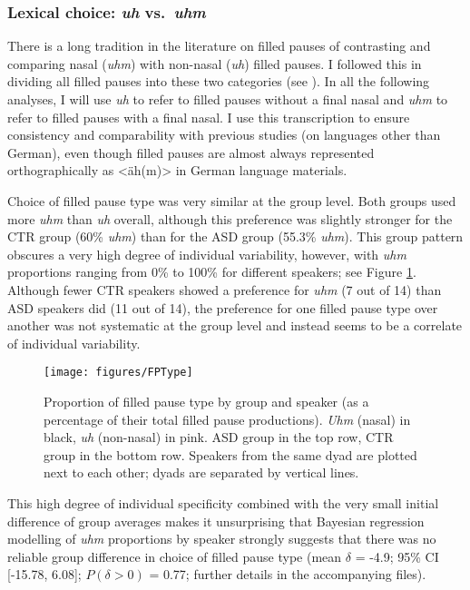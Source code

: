 \subsubsection{\texorpdfstring{Lexical choice: \emph{uh} vs.~\emph{uhm}}{uh vs.~uhm}}\label{BCFP_FP_results_type}


There is a long tradition in the literature on filled pauses of contrasting and comparing nasal (\emph{uhm}) with non-nasal (\emph{uh}) filled pauses. I followed this in dividing all filled pauses into these two categories (see ).
In all the following analyses, I will use \emph{uh} to refer to filled pauses without a final nasal and \emph{uhm} to refer to filled pauses with a final nasal. I use this transcription to ensure consistency and comparability with previous studies (on languages other than German), even though filled pauses are almost always represented orthographically as \textless äh(m)\textgreater{} in German language materials.

Choice of filled pause type was very similar at the group level. Both groups used more \emph{uhm} than \emph{uh} overall, although this preference was slightly stronger for the CTR group (60\% \emph{uhm}) than for the ASD group (55.3\% \emph{uhm}). This group pattern obscures a very high degree of individual variability, however, with \emph{uhm} proportions ranging from 0\% to 100\% for different speakers; see Figure \ref{fig:FPType}. Although fewer CTR speakers showed a preference for \emph{uhm} (7 out of 14) than ASD speakers did (11 out of 14), the preference for one filled pause type over another was not systematic at the group level and instead seems to be a correlate of individual variability.

\begin{figure}
	
	{\texttt{[image: figures/FPType]}
		
	}
	
	\caption{Proportion of filled pause type by group and speaker (as a percentage of their total filled pause productions). \emph{Uhm} (nasal) in black, \emph{uh} (non-nasal) in pink. ASD group in the top row, CTR group in the bottom row. Speakers from the same dyad are plotted next to each other; dyads are separated by vertical lines.}\label{fig:FPType}
\end{figure}

This high degree of individual specificity combined with the very small initial difference of group averages makes it unsurprising that Bayesian regression modelling of \emph{uhm} proportions by speaker strongly suggests that there was no reliable group difference in choice of filled pause type (mean \(\delta\) = -4.9; 95\% CI {[}-15.78, 6.08{]}; \(P(\delta > 0)\) = 0.77; further details in the accompanying files).


